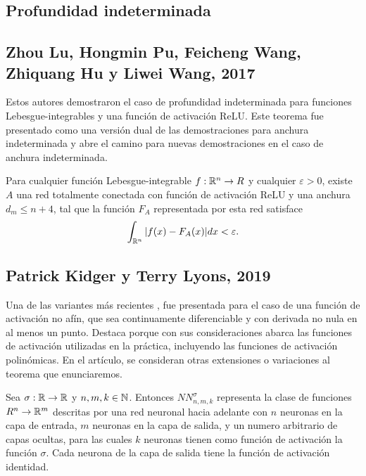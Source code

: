 \begin{itemize}
\section{Profundidad indeterminada}

\subsection{Zhou Lu, Hongmin Pu, Feicheng Wang, Zhiquang Hu y Liwei Wang, 2017}
Estos autores demostraron \cite{2017arXiv170902540L} el caso de profundidad indeterminada para funciones Lebesgue-integrables y una función de activación ReLU. Este teorema fue presentado como una versión dual de las demostraciones para anchura indeterminada y abre el camino para nuevas demostraciones en el caso de anchura indeterminada.

\begin{teorema}
Para cualquier función Lebesgue-integrable $f:\mathbb{R}^n\to R$ y cualquier $\varepsilon>0$, existe $A$ una red totalmente conectada con función de activación ReLU y una anchura $d_m\leq n+4$, tal que la función $F_A$ representada por esta red satisface $$\int_{\mathbb{R}^n}|f(x)-F_A(x)|dx<\varepsilon.$$
\end{teorema}

\subsection{Patrick Kidger y Terry Lyons, 2019}
Una de las variantes más recientes \cite{2019arXiv190508539K}, fue presentada para el caso de una función de activación no afín, que sea continuamente diferenciable y con derivada no nula en al menos un punto. Destaca porque con sus consideraciones abarca las funciones de activación utilizadas en la práctica, incluyendo las funciones de activación polinómicas. En el artículo, se consideran otras extensiones o variaciones al teorema que enunciaremos.\\

\begin{definicion}
Sea $\sigma:\mathbb{R}\to\mathbb{R}$ y $n,m,k\in\mathbb{N}$. Entonces $NN_{n,m,k}^\sigma$ representa la clase de funciones $R^n\to \mathbb{R}^m$ descritas por una red neuronal hacia adelante con $n$ neuronas en la capa de entrada, $m$ neuronas en la capa de salida, y un numero arbitrario de capas ocultas, para las cuales $k$ neuronas tienen como función de activación la función $\sigma$. Cada neurona de la capa de salida tiene la función de activación identidad.
\end{definicion}


\end{itemize}
